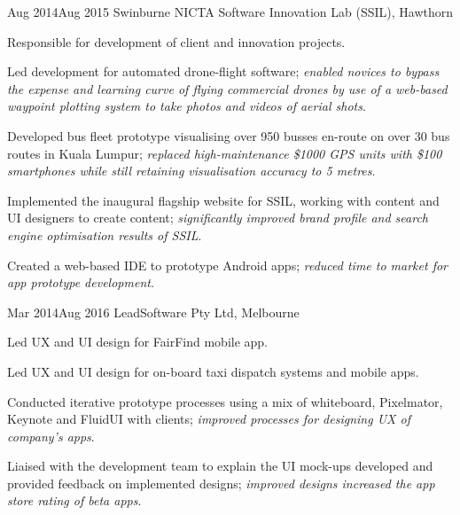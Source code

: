 {Aug 2014}{Aug 2015}
{Swinburne NICTA Software Innovation Lab (SSIL), Hawthorn}
{
  \item Responsible for development of client and innovation projects.
}
{
  \item Led development for automated drone-flight software; \textit{enabled novices to bypass the expense and learning curve of flying commercial drones by use of a web-based waypoint plotting system to take photos and videos of aerial shots}.
  \item Developed bus fleet prototype visualising over 950 busses en-route on over 30 bus routes in Kuala Lumpur; \textit{replaced high-maintenance \$1000 GPS units with \$100 smartphones while still retaining visualisation accuracy to 5 metres}.
  \item Implemented the inaugural flagship website for SSIL, working with content and UI designers to create content; \textit{significantly improved brand profile and search engine optimisation results of SSIL}.
  \item Created a web-based IDE to prototype Android apps; \textit{reduced time to market for app prototype development}.
}



{Mar 2014}{Aug 2016}
{LeadSoftware Pty Ltd, Melbourne}
{
  \item Led UX and UI design for FairFind mobile app.
  \item Led UX and UI design for on-board taxi dispatch systems and mobile apps.
}
{
  \item Conducted iterative prototype processes using a mix of whiteboard, Pixelmator, Keynote and FluidUI with clients; \textit{improved processes for designing UX of company's apps}.
  \item Liaised with the development team to explain the UI mock-ups developed and provided feedback on implemented designs; \textit{improved designs increased the app store rating of beta apps}.
}

\vspace{-2\bigskipamount}